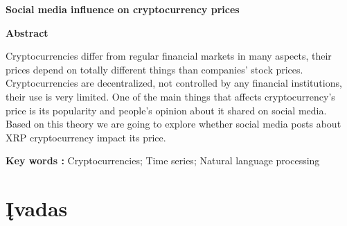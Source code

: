 \documentclass[12pt,a4paper]{article}
\begin{document}
\begin{center}{\large\textbf{Social media influence on cryptocurrency prices}}\end{center}

\begin{small}
\vspace{2\baselineskip}
\begin{center}\textbf{Abstract}\end{center}

Cryptocurrencies differ from regular financial markets in many aspects, their prices depend on totally different things than companies' stock prices. Cryptocurrencies are decentralized, not controlled by any financial institutions, their use is very limited. One of the main things that affects cryptocurrency's price is its popularity and people's opinion about it shared on social media. Based on this theory we are going to explore whether social media posts about XRP cryptocurrency impact its price. 
\vspace{\baselineskip}

\noindent\textbf{Key words :}
Cryptocurrencies; Time series; Natural language processing
\end{small}
\vspace{\baselineskip}
\thispagestyle{empty}

\newpage

\pagestyle{plain}

\clearpage
\printglossary[type=\acronymtype]
\newpage

\section{Įvadas}
\end{document}
